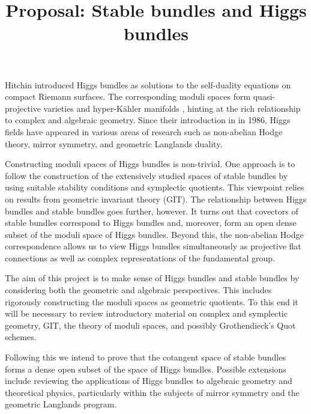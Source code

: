 \documentclass{article}
\title{Proposal: Stable bundles and Higgs bundles}
\begin{document}
Hitchin introduced Higgs bundles as solutions to the self-duality
equations on compact Riemann surfaces. \cite{hitchin1986} The
corresponding moduli spaces form quasi-projective varieties and
hyper-K\"ahler manifolds \cite{mccarthy2020}, hinting at the rich relationship to complex
and algebraic geometry.
Since their
introduction in in 1986, Higgs fields have appeared in various areas  of research such
as non-abelian Hodge theory, mirror symmetry, and geometric Langlands duality.
\cite{bradlow2007}

Constructing moduli spaces of Higgs bundles is non-trivial. One approach
is to follow the construction of the extensively studied spaces of
stable bundles by using suitable stability conditions and symplectic
quotients. This viewpoint relies on results from geometric
invariant theory (GIT). \cite{neitzke2021} The relationship between Higgs bundles and stable
bundles goes further, however. It turns out that covectors of stable
bundles correspond to Higgs bundles and, moreover, form an open
dense subset of the moduli space of Higgs bundles.
Beyond this, the non-abelian Hodge correspondence
allows us to view Higgs bundles simultaneously as projective flat
connections as well as complex representations of the fundamental
group.

The aim of this project is to make sense of Higgs bundles and stable
bundles by considering both the geometric and algebraic perspectives.
This includes rigorously constructing the moduli spaces as geometric
quotients. To this end it will be necessary to review introductory
material on complex and symplectic geometry, GIT, the theory of
moduli spaces, and possibly Grothendieck's Quot schemes.

Following this we intend to prove that the cotangent space of stable bundles
forms a dense open subset of the space of Higgs bundles. Possible extensions
include reviewing the applications of Higgs bundles to algebraic geometry and
theoretical physics, particularly within the subjects of mirror symmetry and
the geometric Langlands program.


\printbibliography
\end{document}
